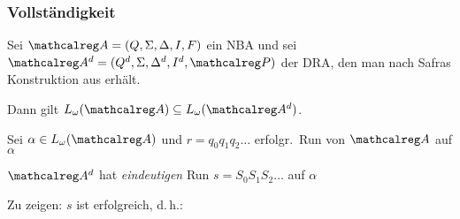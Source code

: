     \begin{frame}
      \frametitle{Vollständigkeit}

      \begin{Lemma}
        Sei $\Aut{A} = (Q,\Sigma,\Delta,I,F)$ ein NBA
        und sei $\Aut{A}^d = (Q^d,\Sigma,\Delta^d,I^d,\calP)$ der DRA,
        den man nach Safras Konstruktion aus  erhält.
        \par\smallskip
        Dann gilt $L_\omega(\Aut{A}) \subseteq L_\omega(\Aut{A}^d)$.
        \label{lem:completeness_safra}
      \end{Lemma}

      \par\smallskip
      \begin{Itemize}
        \item
          Sei $\alpha \in L_\omega(\Aut{A})$ und $r=q_0q_1q_2\dots$ erfolgr.\ Run von $\Aut{A}$ auf $\alpha$
        \item
          $\Aut{A}^d$ hat \emph{eindeutigen} Run $s=S_0S_1S_2\dots$ auf $\alpha$ %
        \item
          Zu zeigen: $s$ ist erfolgreich, d.\,h.:
      \end{Itemize}

      \par



\end{frame}
